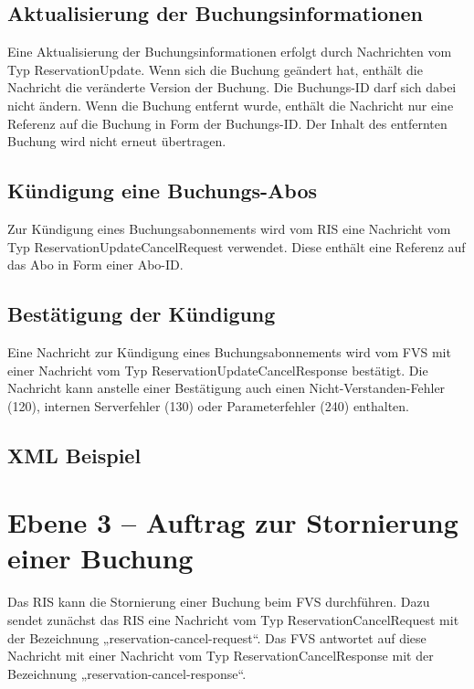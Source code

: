

\subsection{Aktualisierung der Buchungsinformationen}
Eine Aktualisierung der Buchungsinformationen erfolgt durch Nachrichten vom Typ ReservationUpdate. Wenn sich die Buchung geändert hat, enthält die Nachricht die veränderte Version der Buchung. Die Buchungs-ID darf sich dabei nicht ändern. Wenn die Buchung entfernt wurde, enthält die Nachricht nur eine Referenz auf die Buchung in Form der Buchungs-ID. Der Inhalt des entfernten Buchung wird nicht erneut übertragen.



\subsection{Kündigung eine Buchungs-Abos}
Zur Kündigung eines Buchungsabonnements wird vom RIS eine Nachricht vom Typ ReservationUpdateCancelRequest verwendet. Diese enthält eine Referenz auf das Abo in Form einer Abo-ID.



\subsection{Bestätigung der Kündigung}
Eine Nachricht zur Kündigung eines Buchungsabonnements wird vom FVS mit einer Nachricht vom Typ ReservationUpdateCancelResponse bestätigt. Die Nachricht kann anstelle einer Bestätigung auch einen Nicht-Verstanden-Fehler (120), internen Serverfehler (130) oder Parameterfehler (240) enthalten.



\subsection{XML Beispiel}

\section{Ebene 3 -- Auftrag zur Stornierung einer Buchung}
Das RIS kann die Stornierung einer Buchung beim FVS durchführen. Dazu sendet zunächst das RIS eine Nachricht vom Typ ReservationCancelRequest mit der Bezeichnung „reservation-cancel-request“. Das FVS antwortet auf diese Nachricht mit einer Nachricht vom Typ ReservationCancelResponse mit der Bezeichnung „reservation-cancel-response“.

